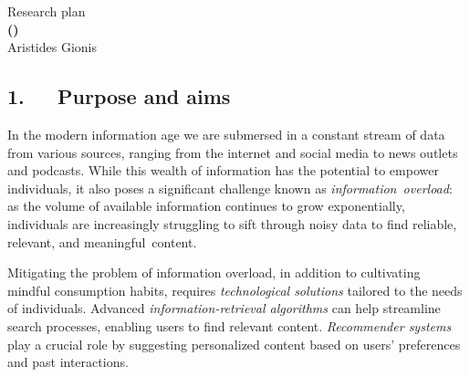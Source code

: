 \documentclass[a4paper,11pt]{article}
\begin{document}
\begin{center} 
{\Large Research plan} \vspace{3mm}\\
{\Large\bf {\proposaltitle} {\sc (}{\acronymtitle}{\sc )}}  \vspace{3mm} \\
{\Large Aristides Gionis} 
\end{center}

\subsection*{1.~~~Purpose and aims}

In the modern information age we are submersed in a constant stream of data from various sources, 
ranging from the internet and social media to news outlets and podcasts. 
While this wealth of information has the potential to empower individuals, 
it also poses a significant challenge known as \emph{information~overload}:
as the volume of available information continues to grow exponentially, 
individuals are increasingly struggling to sift through noisy data
to find reliable, relevant, and meaningful~content.

\iffalse
This overload can lead to decision paralysis, reduced productivity, and cognitive overload, ultimately hindering our ability to make informed decisions and engage critically with the world around us. Addressing the problem of information overload requires not only technological solutions such as improved search algorithms and filtering mechanisms but also a concerted effort to cultivate digital literacy skills and promote mindful consumption habits among individuals.
\fi 

Mitigating the problem of information overload, 
in addition to cultivating mindful consumption habits, 
requires \emph{technological solutions} tailored to the needs of individuals. 
Advanced \emph{information-retrieval algorithms} can help streamline search processes, 
enabling users to find relevant content. 
\emph{Recommender systems} play a crucial role by suggesting personalized content 
based on users' preferences and past interactions. 
\iffalse
The challenge of information overload arises in various scenarios. 
For instance, it occurs when users interact with search engines using keyword searches, 
when peruse product reviews, 
scroll through social-media timelines, or 
receive recommendations for movies or restaurants.
\fi
\end{document}
